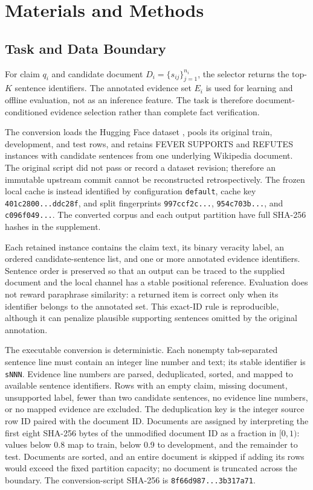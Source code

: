 \documentclass[applsci,article,submit,moreauthors]{Definitions/mdpi}
\begin{document}
\section{Materials and Methods}
\subsection{Task and Data Boundary}
For claim $q_i$ and candidate document $D_i=\{s_{ij}\}_{j=1}^{n_i}$, the selector returns the top-$K$ sentence identifiers. The annotated evidence set $E_i$ is used for learning and offline evaluation, not as an inference feature. The task is therefore document-conditioned evidence selection rather than complete fact verification.

The conversion loads the Hugging Face dataset , pools its original train, development, and test rows, and retains FEVER SUPPORTS and REFUTES instances with candidate sentences from one underlying Wikipedia document. The original script did not pass or record a dataset revision; therefore an immutable upstream commit cannot be reconstructed retrospectively. The frozen local cache is instead identified by configuration \texttt{default}, cache key \texttt{401c2800...ddc28f}, and split fingerprints \texttt{997ccf2c...}, \texttt{954c703b...}, and \texttt{c096f049...}. The converted corpus and each output partition have full SHA-256 hashes in the supplement.

Each retained instance contains the claim text, its binary veracity label, an ordered candidate-sentence list, and one or more annotated evidence identifiers. Sentence order is preserved so that an output can be traced to the supplied document and the local channel has a stable positional reference. Evaluation does not reward paraphrase similarity: a returned item is correct only when its identifier belongs to the annotated set. This exact-ID rule is reproducible, although it can penalize plausible supporting sentences omitted by the original annotation.

The executable conversion is deterministic. Each nonempty tab-separated sentence line must contain an integer line number and text; its stable identifier is \texttt{sNNN}. Evidence line numbers are parsed, deduplicated, sorted, and mapped to available sentence identifiers. Rows with an empty claim, missing document, unsupported label, fewer than two candidate sentences, no evidence line numbers, or no mapped evidence are excluded. The deduplication key is the integer source row ID paired with the document ID. Documents are assigned by interpreting the first eight SHA-256 bytes of the unmodified document ID as a fraction in $[0,1)$: values below 0.8 map to train, below 0.9 to development, and the remainder to test. Documents are sorted, and an entire document is skipped if adding its rows would exceed the fixed partition capacity; no document is truncated across the boundary. The conversion-script SHA-256 is \texttt{8f66d987...3b317a71}.
\end{document}
